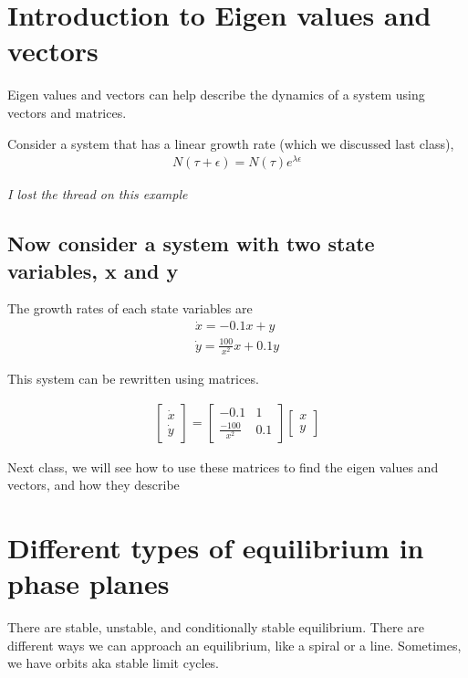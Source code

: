 \documentclass{article}
\begin{document}
\section{Introduction to Eigen values and vectors}
Eigen values and vectors can help describe the dynamics of a system using vectors and matrices. 

Consider a system that has a linear growth rate (which we discussed last class), 
\begin{align}
    N(\tau + \epsilon) = N(\tau) e^{\lambda\epsilon}
\end{align}

\textit{I lost the thread on this example}


\subsection{Now consider a system with two state variables, x and y}

The growth rates of each state variables are 
\begin{align}
    \dot x = -0.1 x + y \\
    \dot y = \frac{100}{x^2} x + 0.1 y
\end{align}

This system can be rewritten using matrices. 

\begin{align}
    \begin{bmatrix}
        \dot x \\
        \dot y
    \end{bmatrix} = 
    \begin{bmatrix}
        -0.1 & 1 \\
        \frac{-100}{x^2} & 0.1
    \end{bmatrix}
    \begin{bmatrix}
        x \\
        y
    \end{bmatrix}
\end{align}

Next class, we will see how to use these matrices to find the eigen values and vectors, and how they describe 

\FloatBarrier

\section{Different types of equilibrium in phase planes}

There are stable, unstable, and conditionally stable equilibrium. There are different ways we can approach an equilibrium, like a spiral or a line. Sometimes, we have orbits aka stable limit cycles. \\
\end{document}
